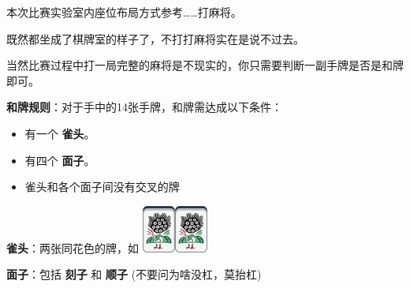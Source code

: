 \documentclass{../cpct/ctpro}
\begin{document}
本次比赛实验室内座位布局方式参考……打麻将。

既然都坐成了棋牌室的样子了，不打打麻将实在是说不过去。

当然比赛过程中打一局完整的麻将是不现实的，你只需要判断一副手牌是否是和牌即可。

\begin{remark}
    \hspace{0.15cm} \textbf{和牌规则}：对于手中的14张手牌，和牌需达成以下条件：

    \begin{itemize}
        \item 有一个 \textbf{雀头}。
        \item 有四个 \textbf{面子}。
        \item 雀头和各个面子间没有交叉的牌
    \end{itemize}

    \hspace{0.15cm} \textbf{雀头}：两张同花色的牌，如 \includegraphics[scale=0.5]{images/mahjong/1s.png}\includegraphics[scale=0.5]{images/mahjong/1s.png}

    \hspace{0.15cm} \textbf{面子}：包括 \textbf{刻子} 和 \textbf{顺子} (不要问为啥没杠，莫抬杠)


\end{remark}
\end{document}
